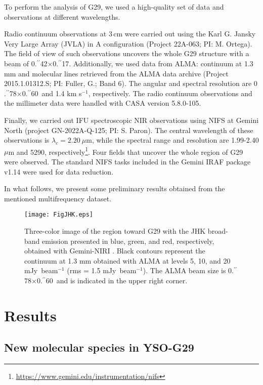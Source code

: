\documentclass[baaa]{baaa}
\begin{document}
To perform the analysis of G29, we used a high-quality set of data and observations at different wavelengths.

Radio continuum observations at 3\,cm were carried out using the Karl G. Jansky Very Large Array (JVLA) in A configuration (Project 22A-063; PI: M. Ortega). The field of view of such observations uncovers the whole G29 structure with a beam of 0$.\!\!^{\prime\prime}$42$\times$0$.\!\!^{\prime\prime}$17. Additionally, we used data from ALMA: continuum at 1.3 mm and molecular lines retrieved from the ALMA data archive (Project 2015.1.01312.S; PI: Fuller, G.; Band 6). The angular and spectral resolution are 0$.\!\!^{\prime\prime}$78$\times$0$.\!\!^{\prime\prime}$60~and 1.4 km s$^{-1}$, respectively. The radio continuum observations and the millimeter data were handled with CASA version 5.8.0-105.

Finally, we carried out IFU spectroscopic NIR observations using NIFS at Gemini North (project GN-2022A-Q-125; PI: S. Paron). The central wavelength of these observations is $\lambda_{c} = 2.20~\mu$m, while the spectral range and resolution are 1.99-2.40 $\mu$m and 5290, respectively\footnote{\url{https://www.gemini.edu/instrumentation/nifs}}. Four fields that uncover the whole region of G29 were observed. The standard NIFS tasks included in the Gemini IRAF package v1.14 were used for data reduction.

In what follows, we present some preliminary results obtained from the mentioned multifrequency dataset. 


\begin{figure}
    \centering
    \texttt{[image: FigJHK.eps]}
    \caption{Three-color image of the region toward G29 with the JHK broad-band emission presented in blue, green, and red, respectively, obtained with Gemini-NIRI \citep{areal20}. Black contours represent the continuum at 1.3 mm obtained with ALMA at levels 5, 10, and 20 mJy~beam$^{-1}$ (rms = 1.5 mJy~beam$^{-1}$). The ALMA beam size is 0$.\!\!^{\prime\prime}$78$\times$0$.\!\!^{\prime\prime}$60~and is indicated in the upper right corner.}
    \label{g29}
\end{figure}

\section{Results}\label{res}

\subsection{New molecular species in YSO-G29}
\end{document}
